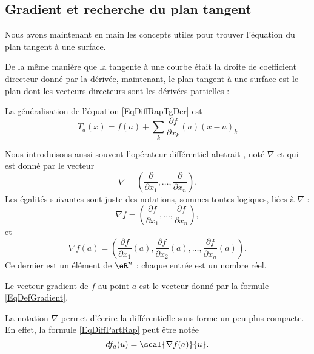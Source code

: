 \subsection{Gradient et recherche du plan tangent}

Nous avons maintenant en main les concepts utiles pour trouver l'équation du plan tangent à une surface.

De la même manière que la tangente à une courbe était la droite de coefficient directeur donné par la dérivée, maintenant, le plan tangent à une surface est le plan dont les vecteurs directeurs sont les dérivées partielles :

La généralisation de l'équation \eqref{EqDiffRapTgDer} est
\begin{equation}        \label{EqDefPlanTag}
	T_a(x)=f(a)+\sum_k\frac{ \partial f }{ \partial x_k }(a)(x-a)_k
\end{equation}

Nous introduisons aussi souvent l'opérateur différentiel abstrait , noté \( \nabla\) et qui est donné par le vecteur
\begin{equation}
	\nabla=\left( \frac{ \partial  }{ \partial x_1 },\ldots,\frac{ \partial  }{ \partial x_n } \right).
\end{equation}
Les égalités suivantes sont juste des notations, sommes toutes logiques, liées à \( \nabla\) :
\begin{equation}
	\nabla f=\left( \frac{ \partial f }{ \partial x_1 },\ldots,\frac{ \partial f }{ \partial x_n } \right),
\end{equation}
et
\begin{equation}        \label{EqDefGradient}
	\nabla f(a) = \left(\frac{\partial f}{\partial x_1}(a), \frac{\partial f}{\partial x_2}(a), \ldots, \frac{\partial f}{\partial x_n}(a)\right).
\end{equation}
Ce dernier est un élément de \( \eR^n\) : chaque entrée est un nombre réel.

\begin{definition}
	Le vecteur gradient de \( f\) au point \( a\) est le vecteur donné par la formule \eqref{EqDefGradient}.
\end{definition}
La notation \( \nabla\) permet d'écrire la différentielle sous forme un peu plus compacte. En effet, la formule \eqref{EqDiffPartRap} peut être notée
\begin{equation}
	df_a(u)=\scal{\nabla f(a)}{u}.
\end{equation}

